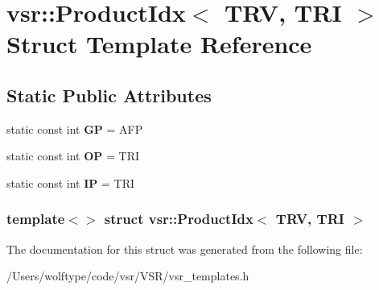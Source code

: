 \hypertarget{structvsr_1_1_product_idx_3_01_t_r_v_00_01_t_r_i_01_4}{\section{vsr\-:\-:Product\-Idx$<$ T\-R\-V, T\-R\-I $>$ Struct Template Reference}
\label{structvsr_1_1_product_idx_3_01_t_r_v_00_01_t_r_i_01_4}
}
\subsection*{Static Public Attributes}
\begin{DoxyCompactItemize}
\item 
\hypertarget{structvsr_1_1_product_idx_3_01_t_r_v_00_01_t_r_i_01_4_adfcc2f1e5f73bff7a787e954e6a7e0ed}{static const int {\bfseries G\-P} = A\-F\-P}\label{structvsr_1_1_product_idx_3_01_t_r_v_00_01_t_r_i_01_4_adfcc2f1e5f73bff7a787e954e6a7e0ed}

\item 
\hypertarget{structvsr_1_1_product_idx_3_01_t_r_v_00_01_t_r_i_01_4_a2dd94e08ffd55d9fe5f341176eb9dd70}{static const int {\bfseries O\-P} = T\-R\-I}\label{structvsr_1_1_product_idx_3_01_t_r_v_00_01_t_r_i_01_4_a2dd94e08ffd55d9fe5f341176eb9dd70}

\item 
\hypertarget{structvsr_1_1_product_idx_3_01_t_r_v_00_01_t_r_i_01_4_a72dcb5e887ea0be9d5fb81d97738fca1}{static const int {\bfseries I\-P} = T\-R\-I}\label{structvsr_1_1_product_idx_3_01_t_r_v_00_01_t_r_i_01_4_a72dcb5e887ea0be9d5fb81d97738fca1}

\end{DoxyCompactItemize}
\subsubsection*{template$<$$>$ struct vsr\-::\-Product\-Idx$<$ T\-R\-V, T\-R\-I $>$}



The documentation for this struct was generated from the following file\-:\begin{DoxyCompactItemize}
\item 
/\-Users/wolftype/code/vsr/\-V\-S\-R/vsr\-\_\-templates.\-h\end{DoxyCompactItemize}
